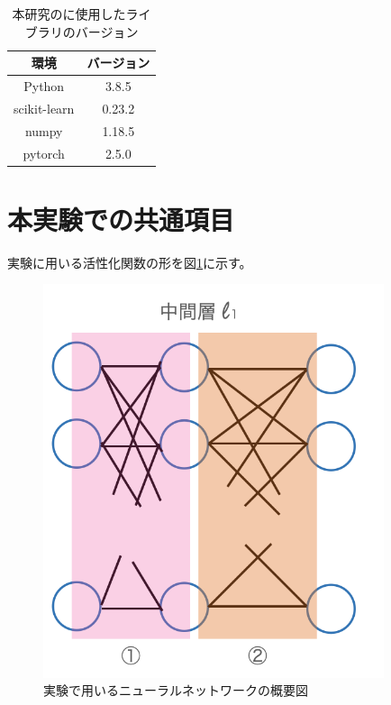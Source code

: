 \begin{table}[htbp]
    \begin{center}
        \caption{本研究のに使用したライブラリのバージョン}
        \label{impl2_table}
        \begin{tabular}{|c|c|}
        \hline
        環境              & バージョン \\
        \hline
        Python            & 3.8.5  \\
        \hline
        scikit-learn      & 0.23.2\\
        \hline
        numpy             & 1.18.5 \\
        \hline
        pytorch           & 2.5.0 \\
        \hline
        \end{tabular}
    \end{center}
\end{table}

\section{本実験での共通項目}
\label{exp_common}

実験に用いる活性化関数の形を図\ref{k-af-net}に示す。
\begin{figure}[hbtp]
    \begin{center}
        \includegraphics[width=10cm]{asset/k-af-net.png}
            \caption{実験で用いるニューラルネットワークの概要図}
            \label{k-af-net}
    \end{center}
\end{figure}

